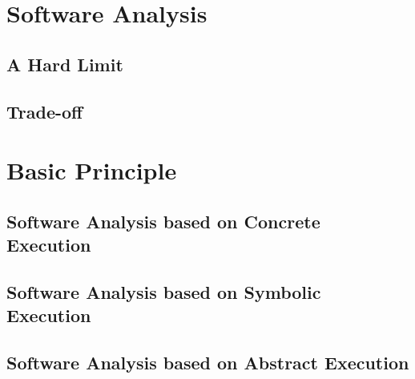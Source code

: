 
\cite{youtube:COSE419-Lecture1-1}
\cite{youtube:COSE419-Lecture1-2}
\cite{naver:bycho211-1}

\section{Software Analysis}

\subsection{A Hard Limit}

\subsection{Trade-off}

\section{Basic Principle}
\subsection{Software Analysis based on Concrete Execution}
\subsection{Software Analysis based on Symbolic Execution}
\subsection{Software Analysis based on Abstract Execution}